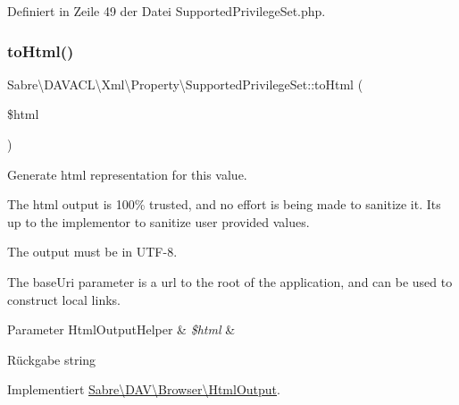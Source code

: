 Definiert in Zeile 49 der Datei Supported\+Privilege\+Set.\+php.

\mbox{\label{class_sabre_1_1_d_a_v_a_c_l_1_1_xml_1_1_property_1_1_supported_privilege_set_ade307197eaf785d53793154ac0a0f2e6}} 
\subsubsection{\texorpdfstring{to\+Html()}{toHtml()}}
{\footnotesize\ttfamily Sabre\textbackslash{}\+D\+A\+V\+A\+C\+L\textbackslash{}\+Xml\textbackslash{}\+Property\textbackslash{}\+Supported\+Privilege\+Set\+::to\+Html (\begin{DoxyParamCaption}\item[{\mbox{\hyperlink{class_sabre_1_1_d_a_v_1_1_browser_1_1_html_output_helper}{Html\+Output\+Helper}}}]{\$html }\end{DoxyParamCaption})}

Generate html representation for this value.

The html output is 100\% trusted, and no effort is being made to sanitize it. It\textquotesingle{}s up to the implementor to sanitize user provided values.

The output must be in U\+T\+F-\/8.

The base\+Uri parameter is a url to the root of the application, and can be used to construct local links.


\begin{DoxyParams}[1]{Parameter}
Html\+Output\+Helper & {\em \$html} & \\
\hline
\end{DoxyParams}
\begin{DoxyReturn}{Rückgabe}
string 
\end{DoxyReturn}


Implementiert \mbox{\hyperlink{interface_sabre_1_1_d_a_v_1_1_browser_1_1_html_output_a53a24f82474cef8c1fcf00e87de3bf7c}{Sabre\textbackslash{}\+D\+A\+V\textbackslash{}\+Browser\textbackslash{}\+Html\+Output}}.



